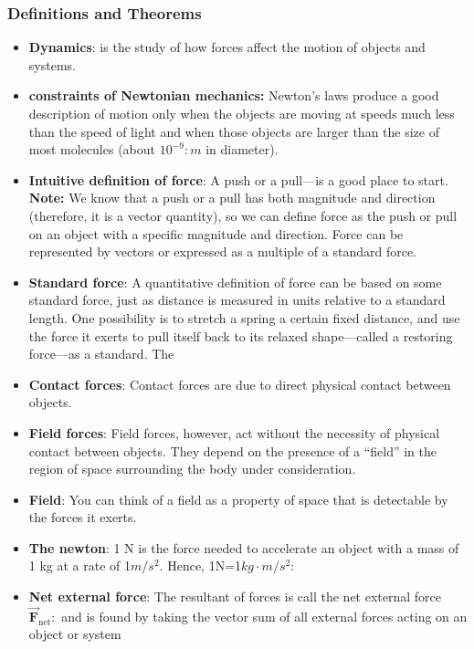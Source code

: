 \documentclass{report}
\begin{document}
        \subsubsection{Definitions and Theorems}
        \begin{itemize}
            \item \textbf{Dynamics}: is the study of how forces affect the motion of objects and systems.
            \item \textbf{constraints of Newtonian mechanics:} Newton’s laws produce a good description of motion only when the objects are moving at speeds much less than the speed of light and when those objects are larger than the size of most molecules (about  $10^{-9}:m$ in diameter).
            \item \textbf{Intuitive definition of force}: A push or a pull—is a good place to start.
                \bigbreak \noindent 
                \textbf{Note:} We know that a push or a pull has both magnitude and direction (therefore, it is a vector quantity), so we can define force as the push or pull on an object with a specific magnitude and direction. Force can be represented by vectors or expressed as a multiple of a standard force.
            \item \textbf{Standard force}: A quantitative definition of force can be based on some standard force, just as distance is measured in units relative to a standard length. One possibility is to stretch a spring a certain fixed distance, and use the force it exerts to pull itself back to its relaxed shape—called a restoring force—as a standard. The
            \item \textbf{Contact forces}: Contact forces are due to direct physical contact between objects.
            \item \textbf{Field forces}: Field forces, however, act without the necessity of physical contact between objects. They depend on the presence of a “field” in the region of space surrounding the body under consideration.
            \item \textbf{Field}: You can think of a field as a property of space that is detectable by the forces it exerts.
            \item \textbf{The newton}: 1 N is the force needed to accelerate an object with a mass of 1 kg at a rate of  1$m/s^{2} $. Hence, 1N=1$kg\cdot m/s^{2}:$
            \item \textbf{Net external force}: The resultant of forces is call the net external force $\vec{\mathbf{F}}_{\text{net}}:$ and is found by taking the vector sum of all external forces acting on an object or system

\end{itemize}
\end{document}
